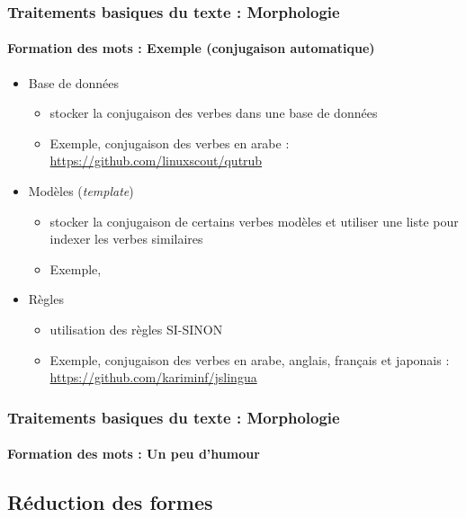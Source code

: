 \documentclass[xcolor=table]{beamer}
\begin{document}
\begin{frame}
\frametitle{Traitements basiques du texte : Morphologie}
\framesubtitle{Formation des mots : Exemple (conjugaison automatique)}

\begin{itemize}
	\item Base de données
	\begin{itemize}
		\item stocker la conjugaison des verbes dans une base de données
		\item Exemple, conjugaison des verbes en arabe : \url{https://github.com/linuxscout/qutrub}
	\end{itemize}
	\item Modèles (\textit{template})
	\begin{itemize}
		\item stocker la conjugaison de certains verbes modèles et utiliser une liste pour indexer les verbes similaires
		\item Exemple, 
	\end{itemize}
	\item Règles
	\begin{itemize}
		\item utilisation des règles SI-SINON
		\item Exemple, conjugaison des verbes en arabe, anglais, français et japonais : \url{https://github.com/kariminf/jslingua}
	\end{itemize}
\end{itemize}

\end{frame}

\begin{frame}
\frametitle{Traitements basiques du texte : Morphologie}
\framesubtitle{Formation des mots : Un peu d'humour}

\begin{center}
\end{center}

\end{frame}

\subsection{Réduction des formes}
\end{document}
